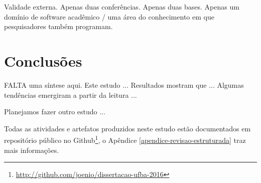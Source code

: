 Validade externa. Apenas duas conferências. Apenas duas bases. Apenas um domínio de software acadêmico / uma área do conhecimento em que pesquisadores também programam.

\section{Conclusões}

FALTA uma síntese aqui. 
Este estudo ...
Resultados mostram que ...
Algumas tendências emergiram a partir da leitura ...

Planejamos fazer outro estudo ... 

Todas as atividades e artefatos produzidos neste estudo estão documentados em
repositório público no
Github\footnote{\url{http://github.com/joenio/dissertacao-ufba-2016}}, o
Apêndice \ref{apendice-revisao-estruturada} traz mais informações.



